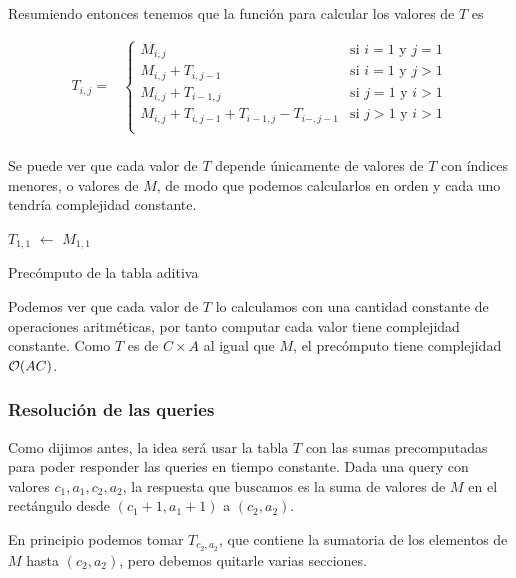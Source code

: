 Resumiendo entonces tenemos que la función para calcular los valores de $T$ es 

\begin{align*}
T_{i,j} =
	&\begin{cases}
		M_{i,j} & \text{si $i=1$ y $j=1$} \\
		M_{i,j} + T_{i,j-1} & \text{si $i=1$ y $j > 1$} \\
		M_{i,j} + T_{i-1,j} & \text{si $j=1$ y $i > 1$} \\
		M_{i,j} + T_{i,j-1} + T_{i-1,j} - T_{i-,j-1} & \text{si $j>1$ y $i > 1$} \\
	\end{cases} \\
\end{align*}

Se puede ver que cada valor de $T$ depende únicamente de valores de $T$ 
con índices menores, o valores de $M$, de modo que podemos calcularlos en 
orden y cada uno tendría complejidad constante. 

\begin{algorithm}[H]
$T_{1,1}$ $\leftarrow$ $M_{1,1}$\;
\caption{Precómputo de la tabla aditiva}
\end{algorithm}

Podemos ver que cada valor de $T$ lo calculamos con una cantidad constante 
de operaciones aritméticas, por tanto computar cada valor tiene complejidad constante. 
Como $T$ es de $C \times A$ al igual que $M$, el precómputo tiene complejidad 
$\mathcal{O}(AC)$.


\subsubsection*{Resolución de las queries}
Como dijimos antes, la idea será usar la tabla $T$ con las sumas precomputadas 
para poder responder las queries en tiempo constante. Dada una query con valores 
$c_1, a_1, c_2, a_2$, la respuesta que buscamos es la suma de valores de $M$ en el 
rectángulo desde $(c_1+1, a_1+1)$ a $(c_2,a_2)$. 

En principio podemos tomar $T_{c_2,a_2}$, que contiene la sumatoria de los 
elementos de $M$ hasta $(c_2,a_2)$, pero debemos quitarle varias secciones. 

